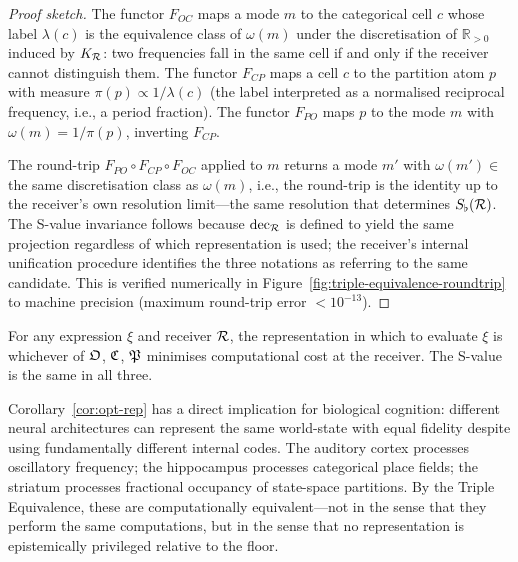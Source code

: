 \begin{proof}[Proof sketch]
The functor $F_{OC}$ maps a mode $m$ to the categorical cell $c$ whose label $\lambda(c)$ is the equivalence class of $\omega(m)$ under the discretisation of $\mathbb{R}_{>0}$ induced by $K_{\mathcal{R}}$: two frequencies fall in the same cell if and only if the receiver cannot distinguish them. The functor $F_{CP}$ maps a cell $c$ to the partition atom $p$ with measure $\pi(p) \propto 1/\lambda(c)$ (the label interpreted as a normalised reciprocal frequency, i.e., a period fraction). The functor $F_{PO}$ maps $p$ to the mode $m$ with $\omega(m) = 1/\pi(p)$, inverting $F_{CP}$.

The round-trip $F_{PO} \circ F_{CP} \circ F_{OC}$ applied to $m$ returns a mode $m'$ with $\omega(m') \in$ the same discretisation class as $\omega(m)$, i.e., the round-trip is the identity up to the receiver's own resolution limit---the same resolution that determines $S_{\flat}(\mathcal{R})$. The S-value invariance follows because $\mathrm{dec}_{\mathcal{R}}$ is defined to yield the same projection regardless of which representation is used; the receiver's internal unification procedure identifies the three notations as referring to the same candidate. This is verified numerically in Figure~\ref{fig:triple-equivalence-roundtrip} to machine precision (maximum round-trip error $< 10^{-13}$).
\end{proof}

\begin{corollary}\label{cor:opt-rep}
For any expression $\xi$ and receiver $\mathcal{R}$, the representation in which to evaluate $\xi$ is whichever of $\mathfrak{O}$, $\mathfrak{C}$, $\mathfrak{P}$ minimises computational cost at the receiver. The S-value is the same in all three.
\end{corollary}

Corollary~\ref{cor:opt-rep} has a direct implication for biological cognition: different neural architectures can represent the same world-state with equal fidelity despite using fundamentally different internal codes. The auditory cortex processes oscillatory frequency; the hippocampus processes categorical place fields; the striatum processes fractional occupancy of state-space partitions. By the Triple Equivalence, these are computationally equivalent---not in the sense that they perform the same computations, but in the sense that no representation is epistemically privileged relative to the floor.

